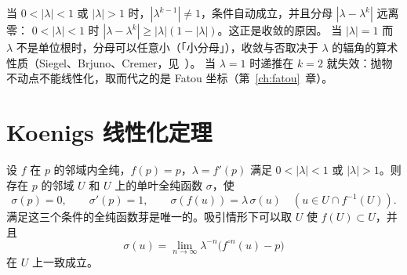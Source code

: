 当 $0<|\lambda|<1$ 或 $|\lambda|>1$ 时，$|\lambda^{k-1}|\ne1$，条件自动成立，并且分母 $|\lambda-\lambda^k|$ 远离零：
$0<|\lambda|<1$ 时 $|\lambda-\lambda^k|\ge|\lambda|(1-|\lambda|)$。这正是收敛的原因。
当 $|\lambda|=1$ 而 $\lambda$ 不是单位根时，分母可以任意小（「小分母」），收敛与否取决于 $\lambda$ 的辐角的算术性质（Siegel、Brjuno、Cremer，见~\cite[\S11]{Milnor2006}）。
当 $\lambda=1$ 时递推在 $k=2$ 就失效：抛物不动点不能线性化，取而代之的是 Fatou 坐标（第~\ref{ch:fatou}~章）。

\section{Koenigs 线性化定理}\label{ch2:sec:koenigs}

\begin{theorem}\label{thm:koenigs}
设 $f$ 在 $p$ 的邻域内全纯，$f(p)=p$，$\lambda=f'(p)$ 满足 $0<|\lambda|<1$ 或 $|\lambda|>1$。则存在 $p$ 的邻域 $U$ 和 $U$ 上的单叶全纯函数 $\sigma$，使
\[
  \sigma(p)=0,\qquad \sigma'(p)=1,\qquad \sigma(f(u))=\lambda\,\sigma(u)\quad(u\in U\cap f^{-1}(U)).
\]
满足这三个条件的全纯函数芽是唯一的。吸引情形下可以取 $U$ 使 $f(U)\subset U$，并且
\begin{equation}\label{ch2:eq:koenigs-limit}
  \sigma(u)=\lim_{n\to\infty}\lambda^{-n}\bigl(f^{\circ n}(u)-p\bigr)
\end{equation}
在 $U$ 上一致成立。
\end{theorem}


